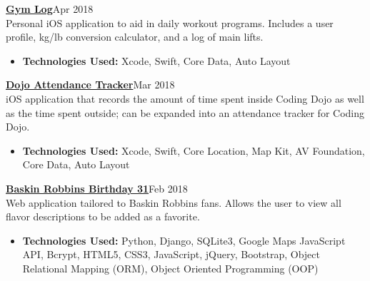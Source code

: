 \documentclass[margin]{res}
\begin{document}
\begin{resume}
\href{https://github.com/ccasil/GymLog}{\bf Gym Log}\hfill Apr 2018\\
Personal iOS application to aid in daily workout programs. Includes a user profile, kg/lb conversion calculator, and a log of main lifts.
\begin{itemize} \itemsep -2pt %
	\item \textbf{Technologies Used:} Xcode, Swift, Core Data, Auto Layout
\end{itemize}

\href{https://github.com/ccasil/geo_hack}{\bf Dojo Attendance Tracker}\hfill Mar 2018\\
iOS application that records the amount of time spent inside Coding Dojo as well as the time spent outside; can be expanded into an attendance tracker for Coding Dojo.
\begin{itemize} \itemsep -2pt %
	\item \textbf{Technologies Used:} Xcode, Swift, Core Location, Map Kit, AV Foundation, Core Data, Auto Layout
\end{itemize}

\href{https://github.com/ccasil/BRB31}{\bf Baskin Robbins Birthday 31}\hfill Feb 2018\\
Web application tailored to Baskin Robbins fans. Allows the user to view all flavor descriptions to be added as a favorite.
\begin{itemize} \itemsep -2pt %
	\item \textbf{Technologies Used:} Python, Django, SQLite3, Google Maps JavaScript API, Bcrypt, HTML5, CSS3, JavaScript, jQuery, Bootstrap, Object Relational Mapping (ORM), Object Oriented Programming (OOP)
\end{itemize}

\end{resume}
\end{document}
